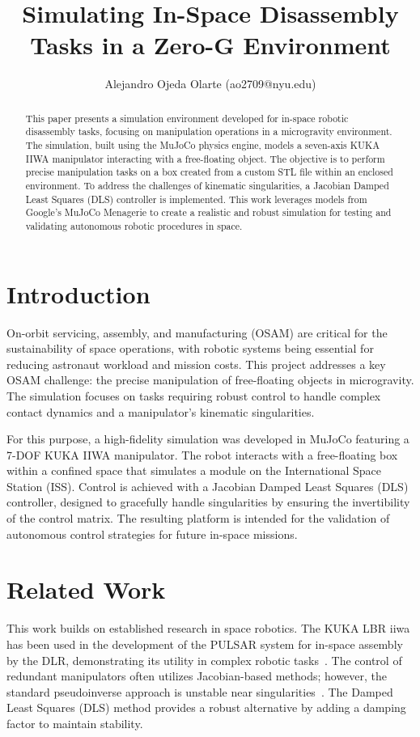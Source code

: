 \documentclass[journal]{IEEEtran}
\begin{document}
\title{Simulating In-Space Disassembly Tasks in a Zero-G Environment}


\author{Alejandro Ojeda Olarte (ao2709@nyu.edu)}


\maketitle


\begin{abstract}
This paper presents a simulation environment developed for in-space robotic disassembly tasks, focusing on manipulation operations in a microgravity environment. The simulation, built using the MuJoCo physics engine, models a seven-axis KUKA IIWA manipulator interacting with a free-floating object. The objective is to perform precise manipulation tasks on a box created from a custom STL file within an enclosed environment. To address the challenges of kinematic singularities, a Jacobian Damped Least Squares (DLS) controller is implemented. This work leverages models from Google's MuJoCo Menagerie to create a realistic and robust simulation for testing and validating autonomous robotic procedures in space.
\end{abstract}

\IEEEpeerreviewmaketitle

\section{Introduction}
On-orbit servicing, assembly, and manufacturing (OSAM) are critical for the sustainability of space operations, with robotic systems being essential for reducing astronaut workload and mission costs. This project addresses a key OSAM challenge: the precise manipulation of free-floating objects in microgravity. The simulation focuses on tasks requiring robust control to handle complex contact dynamics and a manipulator's kinematic singularities.

For this purpose, a high-fidelity simulation was developed in MuJoCo featuring a 7-DOF KUKA IIWA manipulator. The robot interacts with a free-floating box within a confined space that simulates a module on the International Space Station (ISS). Control is achieved with a Jacobian Damped Least Squares (DLS) controller, designed to gracefully handle singularities by ensuring the invertibility of the control matrix. The resulting platform is intended for the validation of autonomous control strategies for future in-space missions.

\section{Related Work}
This work builds on established research in space robotics. The KUKA LBR iiwa has been used in the development of the PULSAR system for in-space assembly by the DLR, demonstrating its utility in complex robotic tasks~\cite{aslam2022space}. The control of redundant manipulators often utilizes Jacobian-based methods; however, the standard pseudoinverse approach is unstable near singularities~\cite{wampler1986manipulator}. The Damped Least Squares (DLS) method provides a robust alternative by adding a damping factor to maintain stability.
\end{document}
